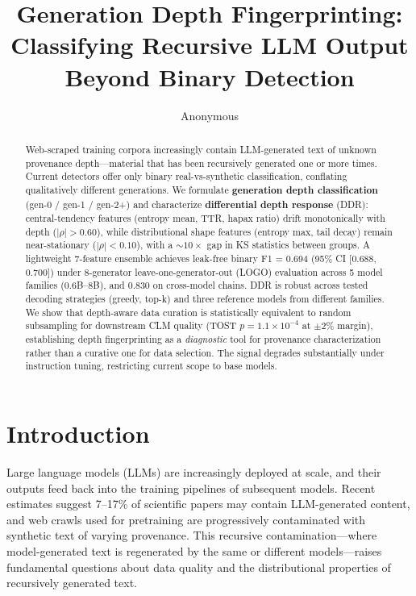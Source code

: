 \documentclass[11pt,a4paper]{article}
\title{Generation Depth Fingerprinting: Classifying Recursive LLM Output\\Beyond Binary Detection}
\author{Anonymous}
\begin{document}
\maketitle

\begin{abstract}
Web-scraped training corpora increasingly contain LLM-generated text of unknown provenance depth---material that has been recursively generated one or more times. Current detectors offer only binary real-vs-synthetic classification, conflating qualitatively different generations. We formulate \textbf{generation depth classification} (gen-0 / gen-1 / gen-2+) and characterize \textbf{differential depth response} (DDR): central-tendency features (entropy mean, TTR, hapax ratio) drift monotonically with depth ($|\rho| > 0.60$), while distributional shape features (entropy max, tail decay) remain near-stationary ($|\rho| < 0.10$), with a ${\sim}10\times$ gap in KS statistics between groups. A lightweight 7-feature ensemble achieves leak-free binary F1 = 0.694 (95\% CI [0.688, 0.700]) under 8-generator leave-one-generator-out (LOGO) evaluation across 5 model families (0.6B--8B), and 0.830 on cross-model chains. DDR is robust across tested decoding strategies (greedy, top-k) and three reference models from different families. We show that depth-aware data curation is statistically equivalent to random subsampling for downstream CLM quality (TOST $p = 1.1 \times 10^{-4}$ at $\pm 2\%$ margin), establishing depth fingerprinting as a \textit{diagnostic} tool for provenance characterization rather than a curative one for data selection. The signal degrades substantially under instruction tuning, restricting current scope to base models.
\end{abstract}

\section{Introduction}
\label{sec:intro}

Large language models (LLMs) are increasingly deployed at scale, and their outputs feed back into the training pipelines of subsequent models. Recent estimates suggest 7--17\% of scientific papers may contain LLM-generated content, and web crawls used for pretraining are progressively contaminated with synthetic text of varying provenance. This recursive contamination---where model-generated text is regenerated by the same or different models---raises fundamental questions about data quality and the distributional properties of recursively generated text.
\end{document}
